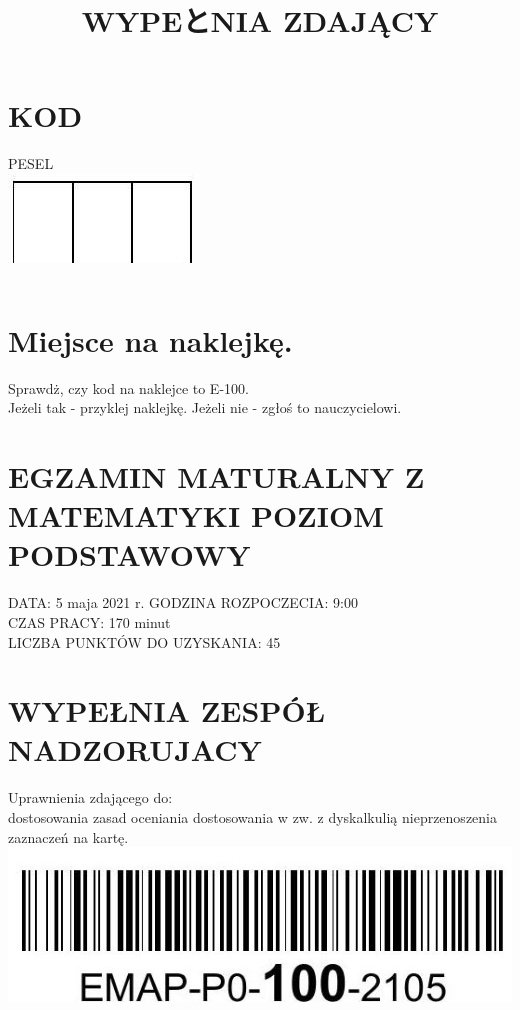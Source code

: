 \documentclass[10pt]{article}
\title{WYPEとNIA ZDAJĄCY }
\author{}
\date{}
\begin{document}
\maketitle
\section*{KOD}
PESEL\\
\includegraphics[max width=\textwidth, center]{2024_11_21_46d945490f1b2eff1c8eg-01(1)}

\begin{center}
\begin{tabular}{|l|l|l|l|l|l|l|l|l|l|l|}
\hline
 &  &  &  &  &  &  &  &  &  &  \\
\hline
\end{tabular}
\end{center}

\section*{Miejsce na naklejkę.}
Sprawdż, czy kod na naklejce to E-100.\\
Jeżeli tak - przyklej naklejkę. Jeżeli nie - zgłoś to nauczycielowi.

\section*{EGZAMIN MATURALNY Z MATEMATYKI POZIOM PODSTAWOWY}
DATA: 5 maja 2021 r. GODZINA ROZPOCZECIA: 9:00\\
CZAS PRACY: 170 minut\\
LICZBA PUNKTÓW DO UZYSKANIA: 45

\section*{WYPEŁNIA ZESPÓŁ NADZORUJACY}
Uprawnienia zdającego do:\\
dostosowania zasad oceniania dostosowania w zw. z dyskalkulią nieprzenoszenia zaznaczeń na kartę.\\
\includegraphics[max width=\textwidth, center]{2024_11_21_46d945490f1b2eff1c8eg-01}
\end{document}
